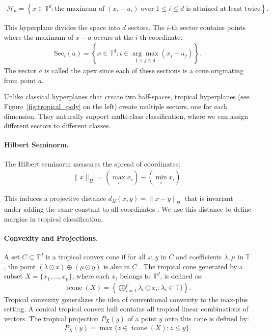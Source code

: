 \documentclass{article}
\newcommand{\tcone}{\operatorname{tcone}}
\renewcommand{\leq}{\leqslant}
\newcommand{\trop}{\mathbb{T}}
\begin{document}
\begin{align}
\mathcal{H}_a = \left\{ x \in \trop^d : \text{the maximum of }(x_i - a_i)\text{ over $1\leq i\leq d$ is attained at least twice} \right\}.
\end{align}

This hyperplane divides the space into $d$ sectors. The $i$-th sector contains points where the maximum of $x - a$ occurs at the $i$-th coordinate:
\begin{align}
\text{Sec}_i(a) = \left\{x \in \trop^d : i \in \underset{1\leq j\leq d}{\arg\max} (x_j - a_j)\right\}.
\end{align}
The vector $a$ is called the apex since 
each of these sections is a cone
originating from point $a$.

Unlike classical hyperplanes that create two half-spaces, tropical hyperplanes (see Figure~\ref{fig:tropical_poly} on the left) create multiple sectors, one for each dimension. They naturally support multi-class classification, where we can assign different sectors to different classes.

\paragraph{Hilbert Seminorm.}
The Hilbert seminorm measures the spread of coordinates:
\begin{align}
\|x\|_H = \left(\max_i x_i\right) - \left(\min_i x_i\right).
\end{align}

This induces a projective distance $d_H(x,y) = \|x - y\|_H$ that is invariant under adding the same constant to all coordinates \cite{cohen2004}. We use this distance to define margins in tropical classification.

\paragraph{Convexity and Projections.}
A set $C \subset \trop^d$ is a tropical convex cone if for all $x,y$ in $C$ and coefficients $\lambda,\mu$ in $\trop$,
the point $(\lambda \odot x) \oplus (\mu \odot y)$ is also in $C$ \cite{cohen2004,develin2004}.
The tropical cone generated by a subset $X=\{x_1,\ldots,x_p\}$, where
each $x_i$ belongs to $\trop^d$, is defined as:
\begin{align}
  \tcone(X) = \left\{\bigoplus_{i=1}^p \lambda_i \odot x_i : \lambda_i \in \trop\} \right\}.\label{e-def-tcone}
\end{align}
Tropical convexity generalizes the idea of conventional convexity to the max-plus setting. A conical tropical convex hull contains all tropical linear combinations of vectors. 
The tropical projection $P_X(y)$ of a point $y$ onto this cone is
defined by:
\begin{align}
P_X(y) = \max\{z \in \tcone(X) : z \leq y\}\label{e-canonical}.
\end{align}
\end{document}
